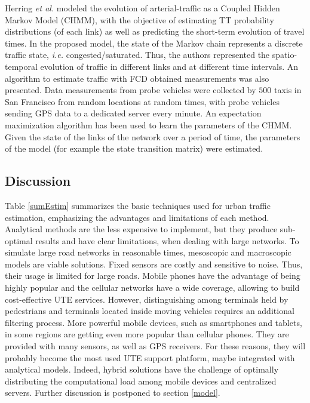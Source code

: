 \documentclass[10pt,onecolumn]{article}
\begin{document}
Herring \textit{et al.} \cite{Herring2010} modeled the evolution of arterial-traffic as a Coupled Hidden Markov Model (CHMM), with the objective of estimating TT probability distributions (of each link) as well as predicting the short-term evolution of travel times. In the proposed model, the state of the Markov chain represents a discrete traffic state, \textit{i.e.} congested/saturated. Thus, the authors represented the spatio-temporal evolution of traffic in different links and at different time intervals. An algorithm to estimate traffic with FCD obtained measurements was also presented. Data measurements from probe vehicles were collected by $500$ taxis in San Francisco from random locations at random times, with probe vehicles sending GPS data to a dedicated server every minute. An expectation maximization algorithm has been used to learn the parameters of the CHMM. Given the state of the links of the network over a period of time, the parameters of the model (for example the state transition matrix) 
were estimated.


\subsection{Discussion}

Table \ref{sumEstim} summarizes the basic techniques used for urban traffic estimation, emphasizing the advantages and limitations of each method. Analytical methods are the less expensive to implement, but they produce sub-optimal results and have clear limitations, when dealing with large networks. To simulate large road networks in reasonable times, mesoscopic and macroscopic models are viable solutions. Fixed sensors are costly and sensitive to noise. Thus, their usage is limited for large roads. Mobile phones have the advantage of being highly popular and the cellular networks have a wide coverage, allowing to build cost-effective UTE services.
However, distinguishing among terminals held by pedestrians and terminals located inside moving vehicles requires an additional filtering process. More powerful mobile devices, such as smartphones and tablets, in some regions are getting even more popular than cellular phones. They are provided with many sensors, as well as GPS receivers. For these reasons, they will probably become the most used UTE support platform, 
maybe integrated with analytical models. Indeed, hybrid solutions have the challenge of optimally distributing the computational load among mobile devices and centralized servers. 
Further discussion is postponed to section \ref{model}.
\end{document}
